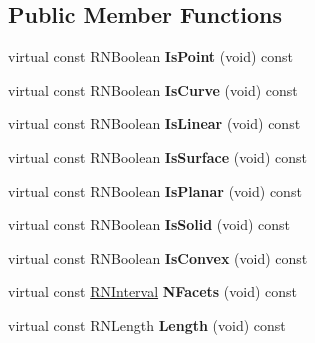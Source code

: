 \subsection*{Public Member Functions}
\begin{DoxyCompactItemize}
\item 
virtual const R\+N\+Boolean {\bfseries Is\+Point} (void) const \hypertarget{class_r3_shape_a65ccc5bc0e4af13ee97b79fe7cbdf0b6}{}\label{class_r3_shape_a65ccc5bc0e4af13ee97b79fe7cbdf0b6}

\item 
virtual const R\+N\+Boolean {\bfseries Is\+Curve} (void) const \hypertarget{class_r3_shape_a374534441c55187f1a6c169bf20a2a75}{}\label{class_r3_shape_a374534441c55187f1a6c169bf20a2a75}

\item 
virtual const R\+N\+Boolean {\bfseries Is\+Linear} (void) const \hypertarget{class_r3_shape_aee3efef05105e16493a81533c4550d52}{}\label{class_r3_shape_aee3efef05105e16493a81533c4550d52}

\item 
virtual const R\+N\+Boolean {\bfseries Is\+Surface} (void) const \hypertarget{class_r3_shape_a73708acac3b0a003b7db9fb0f2ef8f0f}{}\label{class_r3_shape_a73708acac3b0a003b7db9fb0f2ef8f0f}

\item 
virtual const R\+N\+Boolean {\bfseries Is\+Planar} (void) const \hypertarget{class_r3_shape_a8e57e4cb98dec5ee5ec00925b62209bb}{}\label{class_r3_shape_a8e57e4cb98dec5ee5ec00925b62209bb}

\item 
virtual const R\+N\+Boolean {\bfseries Is\+Solid} (void) const \hypertarget{class_r3_shape_addb240a469ab66276d9d854230eac6ea}{}\label{class_r3_shape_addb240a469ab66276d9d854230eac6ea}

\item 
virtual const R\+N\+Boolean {\bfseries Is\+Convex} (void) const \hypertarget{class_r3_shape_a939f0c9ebd6141d7f86c97bb7a36371b}{}\label{class_r3_shape_a939f0c9ebd6141d7f86c97bb7a36371b}

\item 
virtual const \hyperlink{class_r_n_interval}{R\+N\+Interval} {\bfseries N\+Facets} (void) const \hypertarget{class_r3_shape_a7074ed9033c6c86667ba97c63f9c387a}{}\label{class_r3_shape_a7074ed9033c6c86667ba97c63f9c387a}

\item 
virtual const R\+N\+Length {\bfseries Length} (void) const \hypertarget{class_r3_shape_aa5baaded6d628ee2ff091b05111446ec}{}\label{class_r3_shape_aa5baaded6d628ee2ff091b05111446ec}


\end{DoxyCompactItemize}
